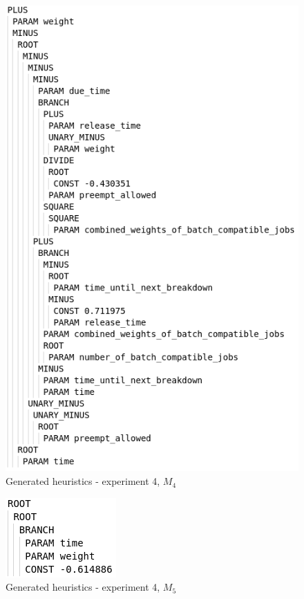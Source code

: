 \begin{figure}[!htbp]
	\centering
	\includegraphics[scale=0.7]{../images/heuristic_05.png}
	\caption{Generated heuristics - experiment 4, $M_4$}
    \label{fig:heuristic_05}
\end{figure}

\begin{figure}[!htbp]
	\centering
	\includegraphics[scale=0.7]{../images/heuristic_06.png}
	\caption{Generated heuristics - experiment 4, $M_5$}
    \label{fig:heuristic_06}
\end{figure}